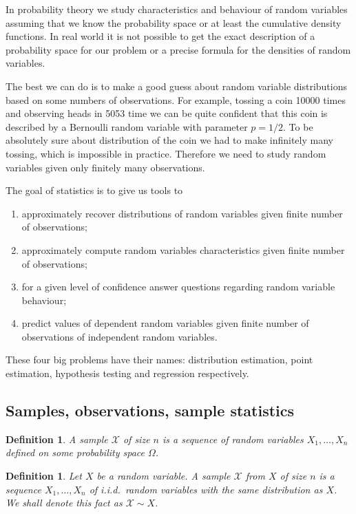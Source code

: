 \documentclass[12pt]{article}
\newtheorem{definition}[theorem]{Definition}
\begin{document}
In probability theory we study characteristics and behaviour of random variables
assuming that we know the probability space or at least the cumulative density
functions. In real world it is not possible to get the exact description of a
probability space for our problem or a precise formula for the densities of
random variables.

The best we can do is to make a good guess about random variable distributions
based on some numbers of observations. For example, tossing a coin 10000 times
and observing heads in 5053 time we can be quite confident that this coin is
described by a Bernoulli random variable with parameter $p=1/2$. To be
absolutely sure about distribution of the coin we had to make infinitely many
tossing, which is impossible in practice. Therefore we need to study random
variables given only finitely many observations.

The goal of statistics is to give us tools to
\begin{enumerate}
    \item approximately recover distributions of random variables given finite
          number of observations;
    \item approximately compute random variables characteristics given finite
          number of observations;
    \item for a given level of confidence answer questions regarding random
          variable behaviour;
    \item predict values of dependent random variables given finite number of
          observations of independent random variables.
\end{enumerate}
These four big problems have their names: distribution estimation, point
estimation, hypothesis testing and regression respectively.

\subsection{Samples, observations, sample statistics}

\begin{definition} A sample $\mathscr{X}$ of size $n$ is a sequence of random
    variables $X_1,\ldots,X_n$ defined on some probability space $\Omega$.
\end{definition}

\begin{definition} Let $X$ be a random variable. A sample $\mathscr{X}$ from $X$
    of size $n$ is a sequence $X_1,\ldots,X_n$ of i.i.d.\ random variables with
    the same distribution as $X$. We shall denote this fact as $\mathscr{X}\sim
        X$.
\end{definition}
\end{document}
